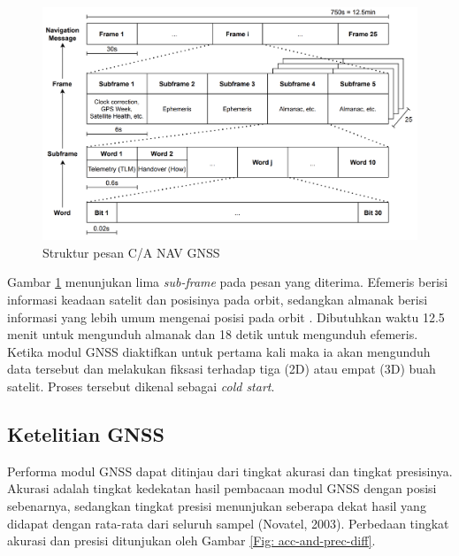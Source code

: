 \begin{figure}[ht]
	\centering
	\includegraphics[width=13cm]{contents/chapter-2/gnss_msg_structure.png}
	\caption{Struktur pesan C/A NAV GNSS}
	\label{Fig: gnss_message_structure}
\end{figure}

Gambar \ref{Fig: gnss_message_structure} menunjukan lima \textit{sub-frame} pada pesan yang diterima. Efemeris berisi informasi keadaan satelit dan posisinya pada orbit, sedangkan almanak berisi informasi yang lebih umum mengenai posisi pada orbit \cite{Lenhart2022}. Dibutuhkan waktu 12.5 menit untuk mengunduh almanak dan 18 detik untuk mengunduh efemeris. Ketika modul GNSS diaktifkan untuk pertama kali maka ia akan mengunduh data tersebut dan melakukan fiksasi terhadap tiga (2D) atau empat (3D) buah satelit. Proses tersebut dikenal sebagai \textit{cold start}. 

\subsection{Ketelitian GNSS}
Performa modul GNSS dapat ditinjau dari tingkat akurasi dan tingkat presisinya. Akurasi adalah tingkat kedekatan hasil pembacaan modul GNSS dengan posisi sebenarnya, sedangkan tingkat presisi menunjukan seberapa dekat hasil yang didapat dengan rata-rata dari seluruh sampel (Novatel, 2003). Perbedaan tingkat akurasi dan presisi ditunjukan oleh Gambar \ref{Fig: acc-and-prec-diff}.

